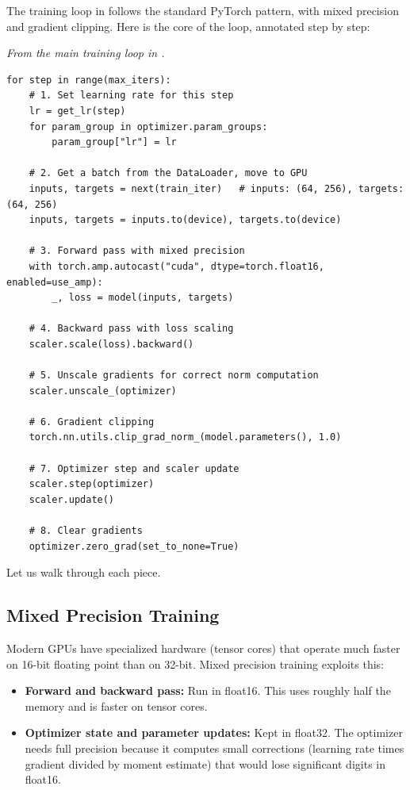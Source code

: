 The training loop in  follows the standard PyTorch pattern, with mixed precision and gradient clipping. Here is the core of the loop, annotated step by step:

\concepttag
{\small\itshape From the main training loop in .}
\begin{lstlisting}
for step in range(max_iters):
    # 1. Set learning rate for this step
    lr = get_lr(step)
    for param_group in optimizer.param_groups:
        param_group["lr"] = lr

    # 2. Get a batch from the DataLoader, move to GPU
    inputs, targets = next(train_iter)   # inputs: (64, 256), targets: (64, 256)
    inputs, targets = inputs.to(device), targets.to(device)

    # 3. Forward pass with mixed precision
    with torch.amp.autocast("cuda", dtype=torch.float16, enabled=use_amp):
        _, loss = model(inputs, targets)

    # 4. Backward pass with loss scaling
    scaler.scale(loss).backward()

    # 5. Unscale gradients for correct norm computation
    scaler.unscale_(optimizer)

    # 6. Gradient clipping
    torch.nn.utils.clip_grad_norm_(model.parameters(), 1.0)

    # 7. Optimizer step and scaler update
    scaler.step(optimizer)
    scaler.update()

    # 8. Clear gradients
    optimizer.zero_grad(set_to_none=True)
\end{lstlisting}

Let us walk through each piece.

\subsection{Mixed Precision Training}

Modern GPUs have specialized hardware (tensor cores) that operate much faster on 16-bit floating point than on 32-bit. Mixed precision training exploits this:

\begin{itemize}
  \item \textbf{Forward and backward pass:} Run in float16. This uses roughly half the memory and is faster on tensor cores.
  \item \textbf{Optimizer state and parameter updates:} Kept in float32. The optimizer needs full precision because it computes small corrections (learning rate times gradient divided by moment estimate) that would lose significant digits in float16.
\end{itemize}

